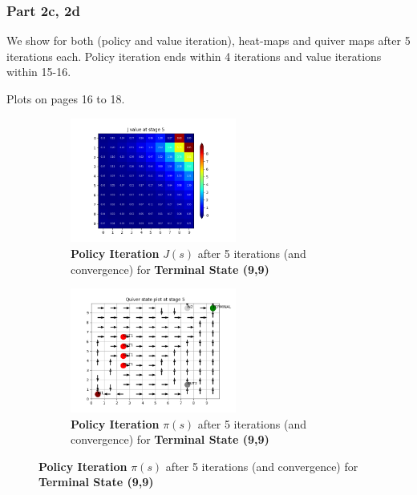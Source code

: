 \subsubsection{Part 2c, 2d}

We show for both (policy and value iteration), heat-maps and quiver maps after 5 iterations each. Policy iteration ends within 4 iterations and value iterations within 15-16.

Plots on pages 16 to 18.

\begin{figure}[h]
\begin{subfigure}
\centering
\includegraphics[angle=0,width=0.6\textwidth]{hw4/logs/policy_iter_t=99_N=20/J-heatmap-5.png}
\caption{ \textbf{Policy Iteration} $J(s)$  after 5 iterations (and convergence) for \textbf{Terminal State (9,9)}}
\end{subfigure}

\begin{subfigure}
\centering
\includegraphics[angle=0,width=0.6\textwidth]{hw4/logs/policy_iter_t=99_N=20/quiver-5.png}
\caption{ \textbf{Policy Iteration}  $\pi(s)$ after 5 iterations (and convergence) for \textbf{Terminal State (9,9)}}
\end{subfigure}
\end{figure}
